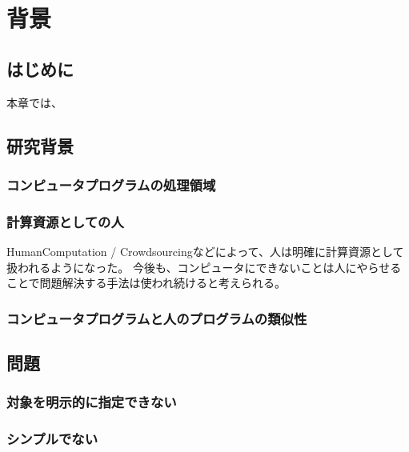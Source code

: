 \chapter{背景}
\label{chap:background}

\section{はじめに}
本章では、
\section{研究背景}

\subsection{コンピュータプログラムの処理領域}

\subsection{計算資源としての人}
HumanComputation / Crowdsourcingなどによって、人は明確に計算資源として扱われるようになった。
今後も、コンピュータにできないことは人にやらせることで問題解決する手法は使われ続けると考えられる。

\subsection{コンピュータプログラムと人のプログラムの類似性}

\section{問題}

\subsection{対象を明示的に指定できない}
\subsection{シンプルでない}

